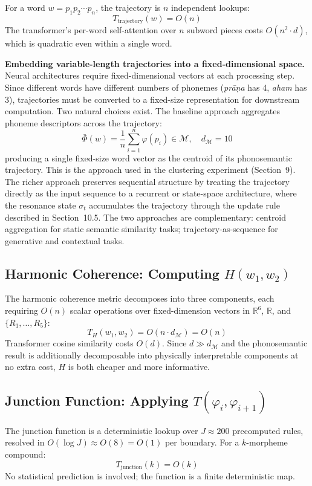 \documentclass[12pt]{article}
\begin{document}
For a word $w = p_1 p_2 \cdots p_n$, the trajectory is $n$ independent lookups:
\[
T_\text{trajectory}(w) = O(n)
\]
The transformer's per-word self-attention over $n$ subword pieces costs $O(n^2 \cdot d)$, which is quadratic even within a single word.

\textbf{Embedding variable-length trajectories into a fixed-dimensional space.}
Neural architectures require fixed-dimensional vectors at each processing step. Since different words have different numbers of phonemes (\textit{prāṇa} has 4, \textit{aham} has 3), trajectories must be converted to a fixed-size representation for downstream computation. Two natural choices exist. The baseline approach aggregates phoneme descriptors across the trajectory:
\[
\bar{\Phi}(w) = \frac{1}{n}\sum_{i=1}^n \varphi(p_i) \in \mathcal{M}, \quad d_\mathcal{M} = 10
\]
producing a single fixed-size word vector as the centroid of its phonosemantic trajectory. This is the approach used in the clustering experiment (Section~9). The richer approach preserves sequential structure by treating the trajectory directly as the input sequence to a recurrent or state-space architecture, where the resonance state $\sigma_t$ accumulates the trajectory through the update rule described in Section~10.5. The two approaches are complementary: centroid aggregation for static semantic similarity tasks; trajectory-as-sequence for generative and contextual tasks.

\subsection{Harmonic Coherence: Computing $H(w_1, w_2)$}

The harmonic coherence metric decomposes into three components, each requiring $O(n)$ scalar operations over fixed-dimension vectors in $\mathbb{R}^6$, $\mathbb{R}$, and $\{R_1,\ldots,R_5\}$:
\[
T_H(w_1, w_2) = O(n \cdot d_\mathcal{M}) = O(n)
\]
Transformer cosine similarity costs $O(d)$. Since $d \gg d_\mathcal{M}$ and the phonosemantic result is additionally decomposable into physically interpretable components at no extra cost, $H$ is both cheaper and more informative.

\subsection{Junction Function: Applying $T(\varphi_i, \varphi_{i+1})$}

The junction function is a deterministic lookup over $J \approx 200$ precomputed rules, resolved in $O(\log J) \approx O(8) = O(1)$ per boundary. For a $k$-morpheme compound:
\[
T_\text{junction}(k) = O(k)
\]
No statistical prediction is involved; the function is a finite deterministic map.
\end{document}

